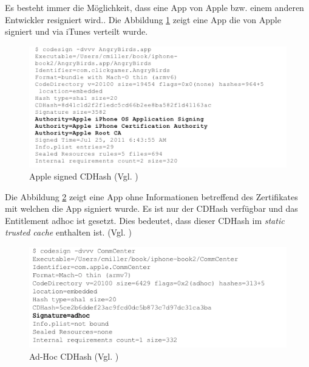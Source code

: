 Es besteht immer die Möglichkeit, dass eine App von Apple bzw. einem anderen Entwickler resigniert wird.\cite{Sign[1], Sign[2], Sign[3], Sign[4], Sign[5]}. Die Abbildung \ref{fig:Apple signed CDHash} zeigt eine App die von Apple signiert und via iTunes verteilt wurde.

\begin{figure}[!ht]
        \centering
        \includegraphics[scale=1.0]{AppleZert_CDHash.png}
        \caption{Apple signed CDHash (Vgl. \cite{Hacking[1]})}
        \label{fig:Apple signed CDHash}
\end{figure}

Die Abbildung \ref{fig:Ad-Hoc CDHash} zeigt eine App ohne Informationen betreffend des Zertifikates mit welchen die App signiert wurde. Es ist nur der CDHash verfügbar und das Entitlement adhoc ist gesetzt. Dies bedeutet, dass dieser CDHash im \textit{\glqq static trusted cache\grqq{}} enthalten ist. (Vgl. \cite{Sign[1], Sign[2], Sign[3], Sign[4], Sign[5]})

\begin{figure}[!ht]
        \centering
        \includegraphics[scale=0.9]{ADhoc_CDHash.png}
        \caption{Ad-Hoc CDHash (Vgl. \cite{Hacking[1]})}
        \label{fig:Ad-Hoc CDHash}
\end{figure}

